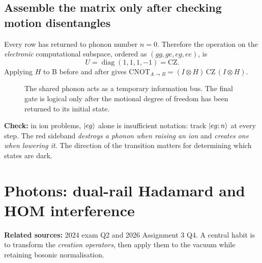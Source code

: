\subsection{Assemble the matrix only after checking motion disentangles}
Every row has returned to phonon number $n=0$. Therefore the operation on the \emph{electronic} computational subspace, ordered as $(gg,ge,eg,ee)$, is
\begin{equation}
\boxed{U=\operatorname{diag}(1,1,1,-1)=\mathrm{CZ}.}
\end{equation}
Applying $H$ to B before and after gives $\mathrm{CNOT}_{A\to B}=(I\otimes H)\,\mathrm{CZ}\,(I\otimes H)$.

\begin{figure}[htbp]
\centering
{}
\caption{The shared phonon acts as a temporary information bus. The final gate is logical only after the motional degree of freedom has been returned to its initial state.}
\end{figure}

\begin{examtip}
\textbf{Check:} in ion problems, $\left\lvert eg\right\rangle$ alone is insufficient notation: track $\left\lvert eg;n\right\rangle$ at every step. The red sideband \emph{destroys a phonon when raising an ion} and \emph{creates one when lowering it}. The direction of the transition matters for determining which states are dark.
\end{examtip}

\section{Photons: dual-rail Hadamard and HOM interference}\label{sec:optics}
\textbf{Related sources:} 2024 exam Q2 and 2026 Assignment 3 Q4. A central habit is to transform the \emph{creation operators}, then apply them to the vacuum while retaining bosonic normalisation.

